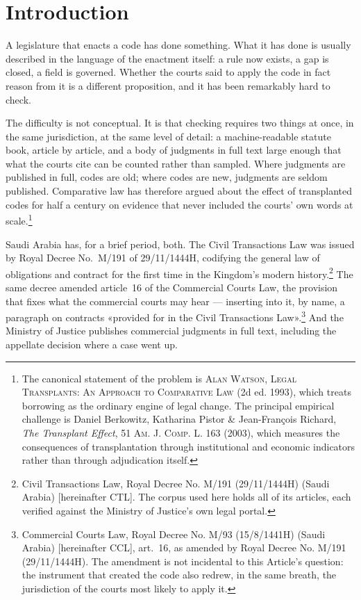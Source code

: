\documentclass[12pt]{article}
\newcommand{\bbook}[1]{\textsc{#1}}
\newcommand{\bjournal}[1]{\textsc{#1}}
\newcommand{\btitle}[1]{\emph{#1}}
\begin{document}
\newpage
\setcounter{page}{1}

\section{Introduction}
\label{sec:intro}

A legislature that enacts a code has done something. What it has done is
usually described in the language of the enactment itself: a rule now exists,
a gap is closed, a field is governed. Whether the courts said to apply the
code in fact reason from it is a different proposition, and it has been
remarkably hard to check.

The difficulty is not conceptual. It is that checking requires two things at
once, in the same jurisdiction, at the same level of detail: a machine-readable
statute book, article by article, and a body of judgments in full text large
enough that what the courts cite can be counted rather than sampled. Where
judgments are published in full, codes are old; where codes are new, judgments
are seldom published. Comparative law has therefore argued about the effect of
transplanted codes for half a century on evidence that never included the
courts' own words at scale.\footnote{The canonical statement of the problem is
\bbook{Alan Watson, Legal Transplants: An Approach to Comparative Law} (2d ed.
1993), which treats borrowing as the ordinary engine of legal change. The
principal empirical challenge is Daniel Berkowitz, Katharina Pistor \&
Jean-Fran\c{c}ois Richard, \btitle{The Transplant Effect}, 51 \bjournal{Am. J.
Comp. L.} 163 (2003), which measures the consequences of transplantation
through institutional and economic indicators rather than through adjudication
itself.}

Saudi Arabia has, for a brief period, both. The Civil Transactions Law was
issued by Royal Decree No.~M/191 of 29/11/1444H, codifying the general law of
obligations and contract for the first time in the Kingdom's modern
history.\footnote{Civil Transactions Law, Royal Decree No. M/191 (29/11/1444H)
(Saudi Arabia) [hereinafter CTL]\label{fn:ctl}. The corpus used here holds all
\nCivilArticles{} of its articles, each verified against the Ministry of
Justice's own legal portal.} The same decree amended article~16 of the
Commercial Courts Law, the provision that fixes what the commercial courts
may hear --- inserting into it, by name, a paragraph on contracts «provided
for in the Civil Transactions Law».\footnote{Commercial Courts Law, Royal Decree No. M/93 (15/8/1441H)
(Saudi Arabia) [hereinafter CCL]\label{fn:ccl}, art.~16, as amended by Royal Decree No.
M/191 (29/11/1444H). The amendment is not incidental to this Article's
question: the instrument that created the code also redrew, in the same
breath, the jurisdiction of the courts most likely to apply it.} And the
Ministry of Justice publishes commercial judgments in full text, including
the appellate decision where a case went up.
\end{document}
